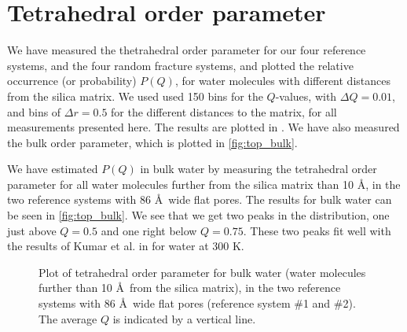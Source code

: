 \section{Tetrahedral order parameter}
%
%

We have measured the thetrahedral order parameter for our four reference systems, and the four random fracture systems, and plotted the relative occurrence (or probability) $P(Q)$, for water molecules with different distances from the silica matrix. We used used 150 bins for the $Q$-values, with $\Delta Q = 0.01$, and bins of $\Delta r = 0.5$ for the different distances to the matrix, for all measurements presented here. The results are plotted in . We have also measured the bulk order parameter, which is plotted in \cref{fig:top_bulk}.

We have estimated $P(Q)$ in bulk water by measuring the tetrahedral order parameter for all water molecules further from the silica matrix than 10 \AA, in the two reference systems with 86 \AA\ wide flat pores. The results for bulk water can be seen in \cref{fig:top_bulk}. We see that we get two peaks in the distribution, one just above $Q = 0.5$ and one right below $Q = 0.75$. These two peaks fit well with the results of Kumar et al. in \cite{kumar2009tetrahedral} for water at 300 K.
%
\begin{figure}[!htb]%
    \centering%
    \caption{%
        Plot of tetrahedral order parameter for bulk water (water molecules further than 10 \AA\ from the silica matrix), in the two reference systems with 86 \AA\ wide flat pores (reference system \#1 and \#2). The average $Q$ is indicated by a vertical line. %
    }%
    \label{fig:top_bulk}%
    \label{fig:first_top_figure}%
\end{figure}%

